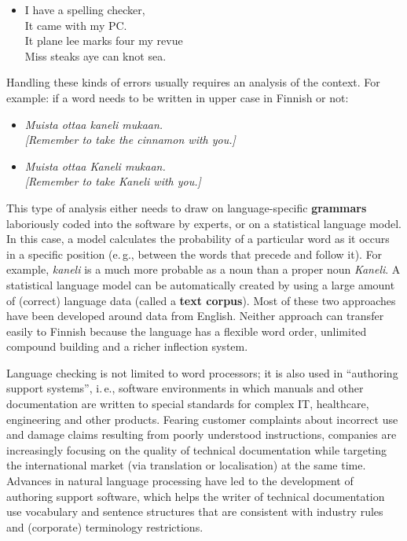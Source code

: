 \begin{multicols}{2}
\begin{itemize}
\item[] I have a spelling checker,\\
  It came with my PC.\\
  It plane lee marks four my revue\\
  Miss steaks aye can knot sea.
\end{itemize}

Handling these kinds of errors usually requires an analysis of the
context. For example: if a word needs to be written in upper case in
Finnish or not:

\begin{itemize}
\item {\foreignlanguage{finnish}{\textit{Muista ottaa kaneli mukaan.}}}\\
  {\textit{[Remember to take the cinnamon with you.]}}
\item {\foreignlanguage{finnish}{\textit{Muista ottaa Kaneli mukaan.}}}\\
  {\textit{[Remember to take Kaneli with you.]} }
\end{itemize}

This type of analysis either needs to draw on language-specific \textbf{grammars} laboriously coded into the software by experts, or on a statistical language model. In this case, a model calculates the probability of a particular word as it occurs in a specific position (e.\,g., between the words that precede and follow it). For example,
 {\foreignlanguage{finnish}{\textit{kaneli}}} is a much more probable
 as a noun than a proper noun
 {\foreignlanguage{finnish}{\textit{Kaneli}}}.  A statistical language model can be automatically created by using a large amount of (correct) language data (called a \textbf{text corpus}).  Most of these two approaches have been developed around data from English. Neither approach can transfer easily to Finnish because the language has a flexible word order, unlimited compound building and a richer inflection system.


Language checking is not limited to word processors; it is also used in ``authoring support systems'', i.\,e., software environments in which manuals and other documentation are written to special standards for complex IT, healthcare, engineering and other products. Fearing customer complaints about incorrect use and damage claims resulting from poorly understood instructions, companies are increasingly focusing on the quality of technical documentation while targeting the international market (via translation or localisation) at the same time. Advances in natural language processing have led to the development of authoring support software, which helps the writer of technical documentation use vocabulary and sentence structures that are consistent with industry rules and (corporate) terminology restrictions.


\end{multicols}
